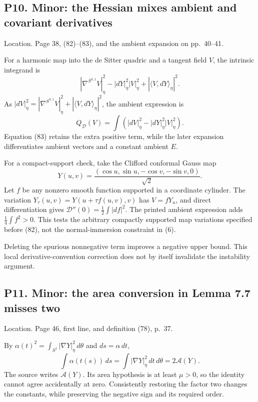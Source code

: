\documentclass[10pt]{article}
\begin{document}
\subsection*{P10. Minor: the Hessian mixes ambient and covariant derivatives}
Location. Page 38, (82)–(83), and the ambient expansion on pp. 40–41.\par
For a harmonic map into the de Sitter quadric and a tangent field \(V\), the intrinsic integrand is \[|\nabla^{S^{3,1}}V|_\eta^2-|dY|_\eta^2|V|_\eta^2
                                  +|\langle V,dY\rangle_\eta|^2.\] As \(|dV|_\eta^2=|\nabla^{S^{3,1}}V|_\eta^2+|\langle V,dY\rangle_\eta|^2\), the ambient expression is \[Q_\mathcal D(V)=\int (|dV|_\eta^2-|dY|_\eta^2|V|_\eta^2).
 \tag{P10.1}\] Equation (83) retains the extra positive term, while the later expansion differentiates ambient vectors and a constant ambient \(E\).\par
For a compact-support check, take the Clifford conformal Gauss map \[Y(u,v)=\frac{(\cos u,\sin u,-\cos v,-\sin v,0)}{\sqrt2}.\] Let \(f\) be any nonzero smooth function supported in a coordinate cylinder. The variation \(Y_\tau(u,v)=Y(u+\tau f(u,v),v)\) has \(V=fY_u\), and direct differentiation gives \(\mathcal D''(0)=\tfrac12\int|df|^2\). The printed ambient expression adds \(\tfrac14\int f^2>0\). This tests the arbitrary compactly supported map variations specified before (82), not the normal-immersion constraint in (6).\par
Deleting the spurious nonnegative term improves a negative upper bound. This local derivative-convention correction does not by itself invalidate the instability argument.\par
\subsection*{P11. Minor: the area conversion in Lemma 7.7 misses two}
Location. Page 46, first line, and definition (78), p. 37.\par
By \(\alpha(t)^2=\int_{S^1}|\nabla Y|_\eta^2\,d\theta\) and \(ds=\alpha\,dt\), \[\int\alpha(t(s))\,ds
     =\int|\nabla Y|_\eta^2\,dt\,d\theta=2\mathcal A(Y).\] The source writes \(\mathcal A(Y)\). Its area hypothesis is at least \(\mu>0\), so the identity cannot agree accidentally at zero. Consistently restoring the factor two changes the constants, while preserving the negative sign and its required order.\par
\end{document}
